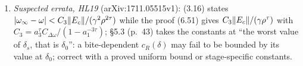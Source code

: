 \begin{remark}
\begin{enumerate}[label=(\roman*)]
  $C_{\Delta\bar{\bar L}^\top}$, the table prints $\sigma_L$ and $C_{\Delta\bar{\bar L}}$ (not a valid general bound; in the canonical case the printed (3.72) equals
  (3.71)); minor: (3.10) prints ``$C_E=$'' for $C_{E^\top}$, p.~19 cites ``Corollary~2.14'' for Corollary~2.16.
\item \emph{Suspected errata, HL19} (arXiv:1711.05515v1): (3.16) states $\lvert \omega_\infty-\omega\rvert<C_3\lVert E_c\rVert/(\gamma^2\rho^{2\tau})$ while the proof (6.51) gives
  $C_3\lVert E_c\rVert/(\gamma\rho^\tau)$ with $C_3=a_3^\tau C_{\Delta\omega}/(1-a_1^{-3\tau})$; \S5.3 (p.~43) takes the constants at ``the worst value of $\delta_s$, that is $\delta_0$'':
  a bite-dependent $c_R(\delta)$ may fail to be bounded by its value at $\delta_0$; correct with a proved uniform bound or stage-specific constants.
\end{enumerate}
\end{remark}
